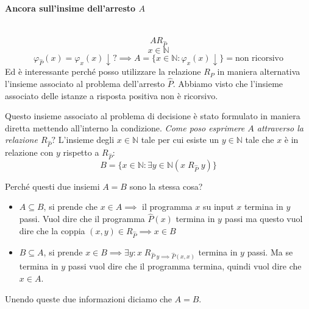 \documentclass{article}
\begin{document}
\paragraph{Ancora sull'insime dell'arresto $A$}\mbox{}\\
$$AR_{\hat{P}}$$
$$x\in\mathbb{N}$$
$$\varphi_{\hat{P}}(x)=\varphi_x(x)\downarrow?\implies A=\{x\in\mathbb{N}:\varphi_x(x)\downarrow\}=\text{non ricorsivo}$$
Ed è interessante perché posso utilizzare la relazione $R_P$ in maniera alternativa
l'insieme associato al problema dell'arresto $\hat{P}$. Abbiamo visto che
l'insieme associato delle istanze a risposta positiva non è ricorsivo.

Questo insieme associato al problema di decisione è stato formulato in maniera diretta mettendo
all'interno la condizione. \textit{Come poso esprimere $A$ attraverso
    la relazione $R_{\hat{P}}?$}
L'insieme degli $x\in\mathbb{N}$ tale per cui esiste un $y\in\mathbb{N}$ tale che
$x$ è in relazione con $y$ rispetto a $R_{\hat{P}}$:
$$B=\{x\in\mathbb{N}:\exists y\in\mathbb{N}(x\;R_{\hat{P}}\;y)\}$$

Perché questi due insiemi $A=B$ sono la stessa cosa?
\begin{itemize}
    \item $A\subseteq B$, si prende che $x\in A\implies$ il programma $x$ su input $x$
          termina in $y$ passi. Vuol dire che il programma $\hat{P}(x)$ termina in $y$ passi
          ma questo vuol dire che la coppia $(x,y)\in R_{\hat{P}}\implies x\in B$

    \item $B\subseteq A$, si prende $x\in B\implies\exists y:x\;R_{\hat{P}\;y\implies\hat{P}(x,x)}$
          termina in $y$ passi. Ma se termina in $y$ passi vuol dire che il programma termina, quindi
          vuol dire che $x\in A$.
\end{itemize}
Unendo queste due informazioni diciamo che $A=B$.
\end{document}
